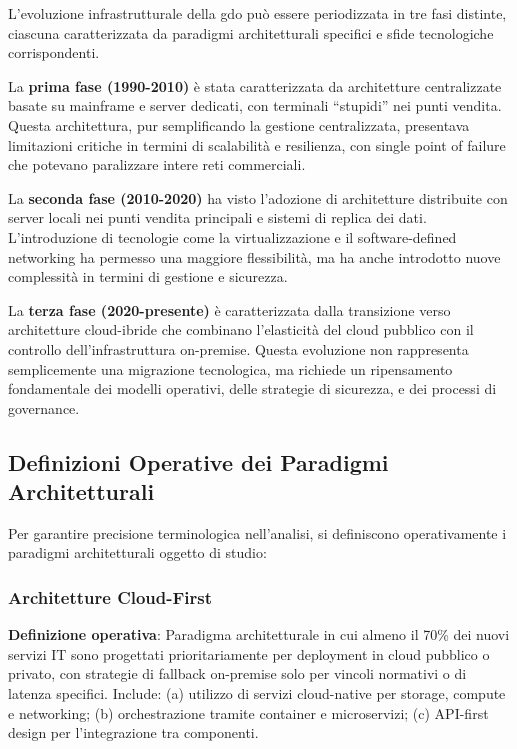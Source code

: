 L'evoluzione infrastrutturale della \gls{gdo} può essere periodizzata in tre fasi distinte, ciascuna caratterizzata da paradigmi architetturali specifici e sfide tecnologiche corrispondenti.

La \textbf{prima fase (1990-2010)} è stata caratterizzata da architetture centralizzate basate su mainframe e server dedicati, con terminali ``stupidi'' nei punti vendita. Questa architettura, pur semplificando la gestione centralizzata, presentava limitazioni critiche in termini di scalabilità e resilienza, con single point of failure che potevano paralizzare intere reti commerciali.

La \textbf{seconda fase (2010-2020)} ha visto l'adozione di architetture distribuite con server locali nei punti vendita principali e sistemi di replica dei dati. L'introduzione di tecnologie come la virtualizzazione e il software-defined networking ha permesso una maggiore flessibilità, ma ha anche introdotto nuove complessità in termini di gestione e sicurezza.

La \textbf{terza fase (2020-presente)} è caratterizzata dalla transizione verso architetture cloud-ibride che combinano l'elasticità del cloud pubblico con il controllo dell'infrastruttura on-premise. Questa evoluzione non rappresenta semplicemente una migrazione tecnologica, ma richiede un ripensamento fondamentale dei modelli operativi, delle strategie di sicurezza, e dei processi di governance.

\subsection{Definizioni Operative dei Paradigmi Architetturali}
\label{subsec:definizioni-operative}

Per garantire precisione terminologica nell'analisi, si definiscono operativamente i paradigmi architetturali oggetto di studio:

\subsubsection{Architetture Cloud-First}

\textbf{Definizione operativa}: Paradigma architetturale in cui almeno il 70\% dei nuovi servizi IT sono progettati prioritariamente per deployment in cloud pubblico o privato, con strategie di fallback on-premise solo per vincoli normativi o di latenza specifici. Include: (a) utilizzo di servizi cloud-native per storage, compute e networking; (b) orchestrazione tramite container e microservizi; (c) API-first design per l'integrazione tra componenti.

